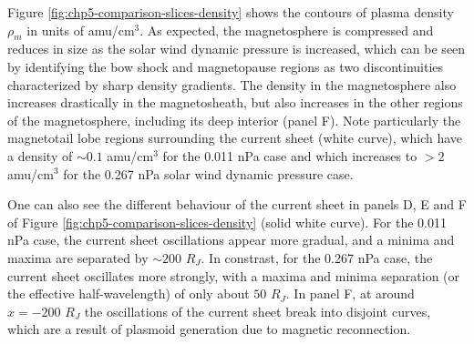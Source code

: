 Figure \ref{fig:chp5-comparison-slices-density} shows the contours of plasma density $\rho_m$ in units of amu/cm$^3$. As expected, the magnetosphere is compressed and reduces in size as the solar wind dynamic pressure is increased, which can be seen by identifying the bow shock and magnetopause regions as two discontinuities characterized by sharp density gradients. The density in the magnetosphere also increases drastically in the magnetosheath, but also increases in the other regions of the magnetosphere, including its deep interior (panel F). Note particularly the magnetotail lobe regions surrounding the current sheet (white curve), which have a density of $\sim0.1$ amu/cm$^3$ for the 0.011 nPa case and which increases to $>2$ amu/cm$^3$ for the 0.267 nPa solar wind dynamic pressure case. 

One can also see the different behaviour of the current sheet in panels D, E and F of Figure \ref{fig:chp5-comparison-slices-density} (solid white curve). For the 0.011 nPa case, the current sheet oscillations appear more gradual, and a minima and maxima are separated by $\sim200$ $R_J$. In constrast, for the 0.267 nPa case, the current sheet oscillates more strongly, with a maxima and minima separation (or the effective half-wavelength) of only about $50$ $R_J$. In panel F, at around $x=-200$ $R_J$ the oscillations of the current sheet break into disjoint curves, which are a result of plasmoid generation due to magnetic reconnection.  

